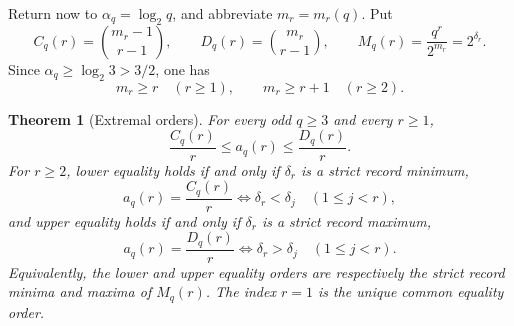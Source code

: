 \documentclass[11pt]{article}
\newtheorem{theorem}{Theorem}
\begin{document}
Return now to \(\alpha_q=\log_2q\), and abbreviate \(m_r=m_r(q)\). Put
\[
 C_q(r)=\binom{m_r-1}{r-1},
 \qquad
 D_q(r)=\binom{m_r}{r-1},
 \qquad
 M_q(r)=\frac{q^r}{2^{m_r}}=2^{\delta_r}.
 \tag{3.6}
\]
Since \(\alpha_q\geq\log_2 3>3/2\), one has
\[
 m_r\geq r\quad(r\geq1),
 \qquad
 m_r\geq r+1\quad(r\geq2).
 \tag{3.7}
\]

\begin{theorem}[Extremal orders]
\label{thm:extremal-orders}
For every odd \(q\geq3\) and every \(r\geq1\),
\[
 \frac{C_q(r)}{r}
 \leq a_q(r)\leq
 \frac{D_q(r)}{r}.
 \tag{3.8}
\]
For \(r\geq2\), lower equality holds if and only if \(\delta_r\) is a
strict record minimum,
\[
 a_q(r)=\frac{C_q(r)}{r}
 \iff
 \delta_r<\delta_j\quad(1\leq j<r),
 \tag{3.9}
\]
and upper equality holds if and only if \(\delta_r\) is a strict record
maximum,
\[
 a_q(r)=\frac{D_q(r)}{r}
 \iff
 \delta_r>\delta_j\quad(1\leq j<r).
 \tag{3.10}
\]
Equivalently, the lower and upper equality orders are respectively the
strict record minima and maxima of \(M_q(r)\). The index \(r=1\) is the
unique common equality order.
\end{theorem}
\end{document}
